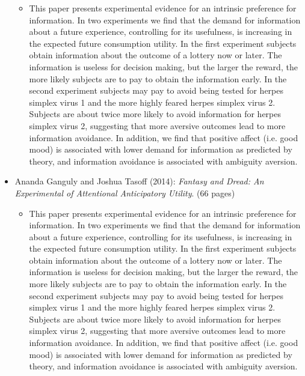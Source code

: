 \begin{itemize}
		\begin{itemize}
			\item This paper presents experimental evidence for an intrinsic preference for information. In two experiments we find that the demand for information about a future experience, controlling for its usefulness, is increasing in the expected future consumption utility. In the first experiment subjects obtain information about the outcome of a lottery now or later. The information is useless for decision making, but the larger the reward, the more likely subjects are to pay to obtain the information early. In the second experiment subjects may pay to avoid being tested for herpes simplex virus 1 and the more highly feared herpes simplex virus 2. Subjects are about twice more likely to avoid information for herpes simplex virus 2, suggesting that more aversive outcomes lead to more information avoidance. In addition, we find that positive affect (i.e. good mood) is associated with lower demand for information as predicted by theory, and information avoidance is associated with ambiguity aversion.
		\end{itemize}
	\item Ananda Ganguly and Joshua Tasoff (2014): \textit{Fantasy and Dread: An Experimental of Attentional Anticipatory Utility}. (66 pages)
		\begin{itemize}
			\item This paper presents experimental evidence for an intrinsic preference for information. In two experiments we find that the demand for information about a future experience, controlling for its usefulness, is increasing in the expected future consumption utility. In the first experiment subjects obtain information about the outcome of a lottery now or later. The information is useless for decision making, but the larger the reward, the more likely subjects are to pay to obtain the information early. In the second experiment subjects may pay to avoid being tested for herpes simplex virus 1 and the more highly feared herpes simplex virus 2. Subjects are about twice more likely to avoid information for herpes simplex virus 2, suggesting that more aversive outcomes lead to more information avoidance. In addition, we find that positive affect (i.e. good mood) is associated with lower demand for information as predicted by theory, and information avoidance is associated with ambiguity aversion.
		\end{itemize}
\end{itemize}


\newpage